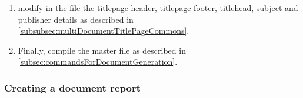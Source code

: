\begin{enumerate}
\begin{enumerate}
\begin{CommandLineListing}[style=DefaultFileListing, print=true, basicstyle={\ttfamily\small}, %
      basewidth=0.47em, xleftmargin=0pt, gobble=6]
      \nocite{Gorbunov2007a}
      \nocite{Gorbunov2002a}
      \nocite{Gorbunov1986}



      
      
      
      
      
      
      

      \appendix
    \end{CommandLineListing}
   \end{enumerate}

 \item modify in the file
    the titlepage
   header, titlepage footer, titlehead, subject and publisher details as
   described in \autoref{subsubsec:multiDocumentTitlePageCommons}.

 \item Finally, compile the master file
    as
   described in \autoref{subsec:commandsForDocumentGeneration}.
\end{enumerate}


\subsubsection[A \multidoc document report]{Creating a \multidoc document report}
\label{subsubsec:creatingMultiDocumentReport}

